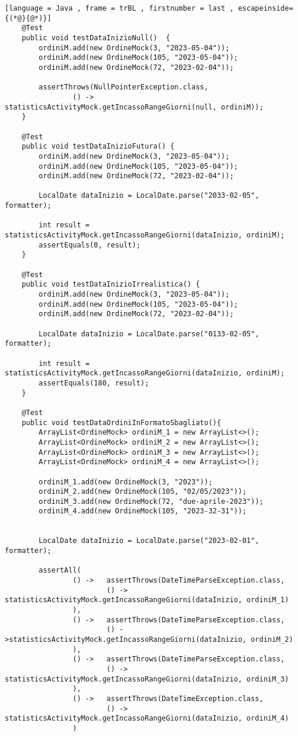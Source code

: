 \begin{lstlisting}[language = Java , frame = trBL , firstnumber = last , escapeinside={(*@}{@*)}]
    @Test
    public void testDataInizioNull()  {
        ordiniM.add(new OrdineMock(3, "2023-05-04"));
        ordiniM.add(new OrdineMock(105, "2023-05-04"));
        ordiniM.add(new OrdineMock(72, "2023-02-04"));

        assertThrows(NullPointerException.class,
                () -> statisticsActivityMock.getIncassoRangeGiorni(null, ordiniM));
    }

    @Test
    public void testDataInizioFutura() {
        ordiniM.add(new OrdineMock(3, "2023-05-04"));
        ordiniM.add(new OrdineMock(105, "2023-05-04"));
        ordiniM.add(new OrdineMock(72, "2023-02-04"));

        LocalDate dataInizio = LocalDate.parse("2033-02-05", formatter);

        int result = statisticsActivityMock.getIncassoRangeGiorni(dataInizio, ordiniM);
        assertEquals(0, result);
    }

    @Test
    public void testDataInizioIrrealistica() {
        ordiniM.add(new OrdineMock(3, "2023-05-04"));
        ordiniM.add(new OrdineMock(105, "2023-05-04"));
        ordiniM.add(new OrdineMock(72, "2023-02-04"));

        LocalDate dataInizio = LocalDate.parse("0133-02-05", formatter);

        int result = statisticsActivityMock.getIncassoRangeGiorni(dataInizio, ordiniM);
        assertEquals(180, result);
    }

    @Test
    public void testDataOrdiniInFormatoSbagliato(){
        ArrayList<OrdineMock> ordiniM_1 = new ArrayList<>();
        ArrayList<OrdineMock> ordiniM_2 = new ArrayList<>();
        ArrayList<OrdineMock> ordiniM_3 = new ArrayList<>();
        ArrayList<OrdineMock> ordiniM_4 = new ArrayList<>();

        ordiniM_1.add(new OrdineMock(3, "2023"));
        ordiniM_2.add(new OrdineMock(105, "02/05/2023"));
        ordiniM_3.add(new OrdineMock(72, "due-aprile-2023"));
        ordiniM_4.add(new OrdineMock(105, "2023-32-31"));


        LocalDate dataInizio = LocalDate.parse("2023-02-01", formatter);

        assertAll(
                () ->   assertThrows(DateTimeParseException.class,
                        () -> statisticsActivityMock.getIncassoRangeGiorni(dataInizio, ordiniM_1)
                ),
                () ->   assertThrows(DateTimeParseException.class,
                        () ->statisticsActivityMock.getIncassoRangeGiorni(dataInizio, ordiniM_2)
                ),
                () ->   assertThrows(DateTimeParseException.class,
                        () -> statisticsActivityMock.getIncassoRangeGiorni(dataInizio, ordiniM_3)
                ),
                () ->   assertThrows(DateTimeException.class,
                        () -> statisticsActivityMock.getIncassoRangeGiorni(dataInizio, ordiniM_4)
                )


\end{lstlisting}
